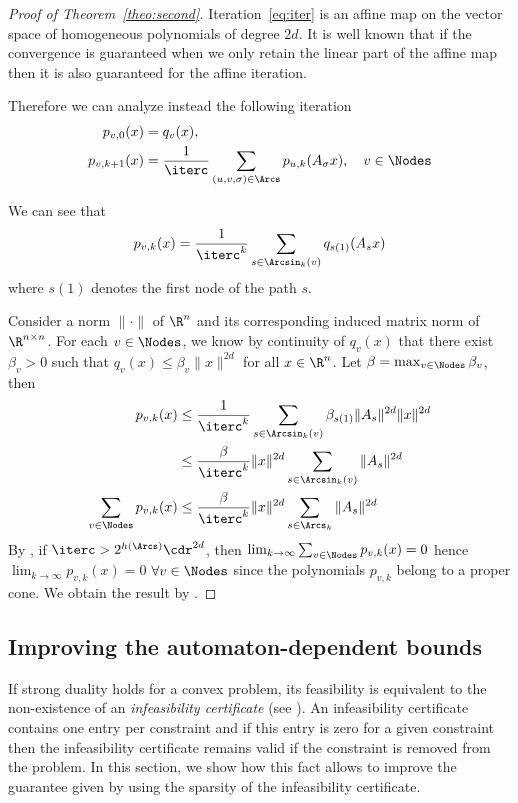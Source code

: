 \documentclass[11pt,twoside,a4paper,openright]{uclouvain-thesis}
\begin{document}
\begin{proof}[Proof of Theorem~\ref{theo:second}]
  Iteration~\eqref{eq:iter} is an affine map on the vector space of
  homogeneous polynomials of degree $2d$.  It is well known that
  if the convergence is guaranteed when we only retain the linear
  part of the affine map then it is also guaranteed for the affine
  iteration.

  Therefore we can analyze instead the following iteration
  \begin{align*}
    p_{v,0}(x) & = q_v(x),\\
    p_{v,k+1}(x) & = \frac{1}{\iterc} %
    \sum_{(u,v,\sigma) \in \Arcs} p_{u,k}(A_\sigma x), \quad  v \in \Nodes
  \end{align*}

  We can see that
  \begin{equation*}
    p_{v,k}(x) = \frac{1}{\iterc^k}\sum_{s \in \Arcsin_k(v)} q_{s(1)}(A_s x)
  \end{equation*}
  where $s(1)$ denotes the first node of the path $s$.

  Consider a norm $\|\cdot\|$ of $\R^n$ and its corresponding induced matrix norm of $\R^{n \times n}$.
  For each $v \in \Nodes$, we know by continuity of $q_v(x)$ that there exist $\beta_v > 0$ such that
  \( q_v(x) \leq \beta_v\|x\|^{2d} \)
  for all $x \in \R^n$.
  Let $\beta = \max_{v \in \Nodes} \beta_v$,
  then
  \begin{align*}
    p_{v,k}(x)
    & \leq \frac{1}{\iterc^k}\sum_{s \in \Arcsin_k(v)} \beta_{s(1)} \|A_s\|^{2d} \|x\|^{2d}\\
    & \leq \frac{\beta}{\iterc^k} \|x\|^{2d} \sum_{s \in \Arcsin_k(v)} \|A_s\|^{2d}\\
    \sum_{v \in \Nodes} p_{v,k}(x)
    & \leq \frac{\beta}{\iterc^k} \|x\|^{2d} \sum_{s \in \Arcs_k} \|A_s\|^{2d}
  \end{align*}
  By , if $\iterc > 2^{h(\Arcs)}\cdr^{2d}$, then
  $\lim_{k \to \infty} \sum_{v \in \Nodes} p_{v,k}(x) = 0$
  hence $\lim_{k \to \infty} p_{v,k}(x) = 0$ $\forall v \in \Nodes$ since the polynomials $p_{v,k}$ belong to a proper cone.
  We obtain the result by .
\end{proof}

\subsection{Improving the automaton-dependent bounds}

If strong duality holds for a convex problem,
its feasibility is equivalent to the non-existence of an \emph{infeasibility certificate} (see \cite[Section~5.8]{boyd2004convex}).
An infeasibility certificate contains one entry per constraint and if this entry is zero for a given constraint
then the infeasibility certificate remains valid if the constraint is removed from the problem.
In this section, we show how this fact allows to improve the guarantee given by  using the sparsity of the infeasibility certificate.
\end{document}

